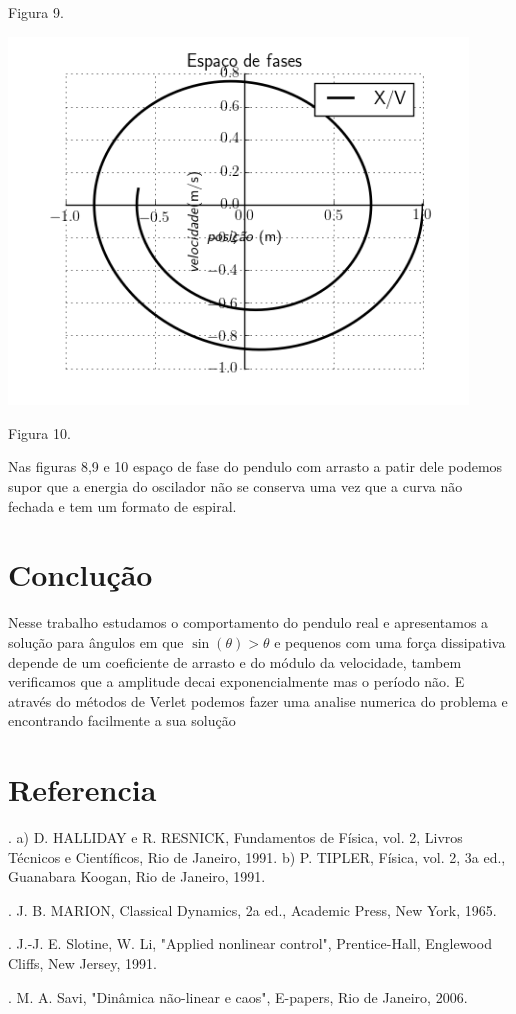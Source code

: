 \documentclass[a4paper]{article} %
\begin{document}
\begin{center}
	\scriptsize  Figura 9. 
	
	\includegraphics[width=4.80in,height=3.84in,keepaspectratio = false]{pendulo3_image3.png}
	
	\scriptsize  Figura 10. 
		
\end{center}

Nas figuras 8,9 e 10 espa\c{c}o de fase do pendulo com arrasto a patir dele podemos supor que a energia do oscilador n\~ao se conserva uma vez que a curva n\~ao fechada e tem um formato de espiral.

\section{Conclu\c{c}\~ao}

Nesse trabalho estudamos o comportamento do pendulo real e apresentamos a solu\c{c}\~ao para \^angulos em que $\sin(\theta) > \theta$ e pequenos com uma for\c{c}a dissipativa depende de um coeficiente de arrasto e do m\'odulo da velocidade, tambem verificamos que a amplitude decai exponencialmente mas o per\'iodo não. E atrav\'es do m\'etodos de Verlet podemos fazer uma analise numerica do problema e encontrando facilmente a sua solu\c{c}\~ao 

\section{Referencia}

\noindent 
{}. a) D. HALLIDAY e R. RESNICK, Fundamentos de F\'isica, vol. 2, Livros T\'ecnicos e Cient\'ificos, Rio de Janeiro, 1991. b) P. TIPLER, F\'isica, vol. 2, 3a ed., Guanabara Koogan, Rio de Janeiro, 1991.

. J. B. MARION, Classical Dynamics, 2a ed., Academic Press, New York, 1965.

. J.-J. E. Slotine, W. Li, "Applied nonlinear control", Prentice-Hall, Englewood Cliffs, New Jersey, 1991.

. M. A. Savi, "Din\^amica n\~ao-linear e caos", E-papers, Rio de Janeiro, 2006.
\end{document}
